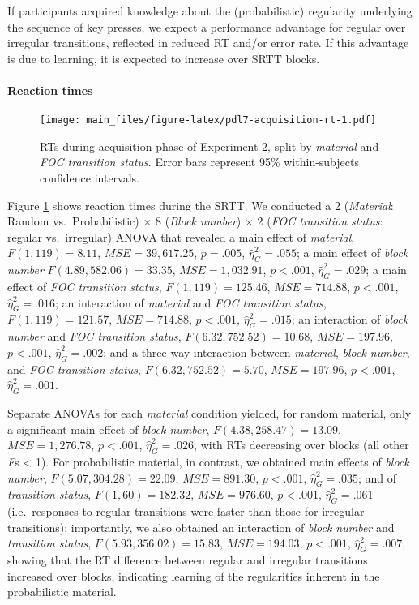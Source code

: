 \documentclass[man]{apa6}
\theoremstyle{definition}
\theoremstyle{definition}
\theoremstyle{definition}
\theoremstyle{remark}
\begin{document}
If participants acquired knowledge about the (probabilistic) regularity
underlying the sequence of key presses, we expect a performance
advantage for regular over irregular transitions, reflected in reduced
RT and/or error rate. If this advantage is due to learning, it is
expected to increase over SRTT blocks.

\paragraph{Reaction times}\label{reaction-times-1}

\begin{figure}
\centering
\texttt{[image: main\_files/figure-latex/pdl7-acquisition-rt-1.pdf]}
\caption{\label{fig:pdl7-acquisition-rt}RTs during acquisition phase of
Experiment 2, split by \emph{material} and \emph{FOC transition status}.
Error bars represent 95\% within-subjects confidence intervals.}
\end{figure}

Figure \ref{fig:pdl7-acquisition-rt} shows reaction times during the
SRTT. We conducted a 2 (\emph{Material}: Random vs.~Probabilistic)
\(\times\) 8 (\emph{Block number}) \(\times\) 2 (\emph{FOC transition
status}: regular vs.~irregular) ANOVA that revealed a main effect of
\emph{material}, \(F(1, 119) = 8.11\), \(\mathit{MSE} = 39,617.25\),
\(p = .005\), \(\hat{\eta}^2_G = .055\); a main effect of \emph{block
number} \(F(4.89, 582.06) = 33.35\), \(\mathit{MSE} = 1,032.91\),
\(p < .001\), \(\hat{\eta}^2_G = .029\); a main effect of \emph{FOC
transition status}, \(F(1, 119) = 125.46\), \(\mathit{MSE} = 714.88\),
\(p < .001\), \(\hat{\eta}^2_G = .016\); an interaction of
\emph{material} and \emph{FOC transition status},
\(F(1, 119) = 121.57\), \(\mathit{MSE} = 714.88\), \(p < .001\),
\(\hat{\eta}^2_G = .015\); an interaction of \emph{block number} and
\emph{FOC transition status}, \(F(6.32, 752.52) = 10.68\),
\(\mathit{MSE} = 197.96\), \(p < .001\), \(\hat{\eta}^2_G = .002\); and
a three-way interaction between \emph{material}, \emph{block number},
and \emph{FOC transition status}, \(F(6.32, 752.52) = 5.70\),
\(\mathit{MSE} = 197.96\), \(p < .001\), \(\hat{\eta}^2_G = .001\).

Separate ANOVAs for each \emph{material} condition yielded, for random
material, only a significant main effect of \emph{block number},
\(F(4.38, 258.47) = 13.09\), \(\mathit{MSE} = 1,276.78\), \(p < .001\),
\(\hat{\eta}^2_G = .026\), with RTs decreasing over blocks (all other
\emph{F}s \textless{} 1). For probabilistic material, in contrast, we
obtained main effects of \emph{block number},
\(F(5.07, 304.28) = 22.09\), \(\mathit{MSE} = 891.30\), \(p < .001\),
\(\hat{\eta}^2_G = .035\); and of \emph{transition status},
\(F(1, 60) = 182.32\), \(\mathit{MSE} = 976.60\), \(p < .001\),
\(\hat{\eta}^2_G = .061\) (i.e.~responses to regular transitions were
faster than those for irregular transitions); importantly, we also
obtained an interaction of \emph{block number} and \emph{transition
status}, \(F(5.93, 356.02) = 15.83\), \(\mathit{MSE} = 194.03\),
\(p < .001\), \(\hat{\eta}^2_G = .007\), showing that the RT difference
between regular and irregular transitions increased over blocks,
indicating learning of the regularities inherent in the probabilistic
material.
\end{document}
